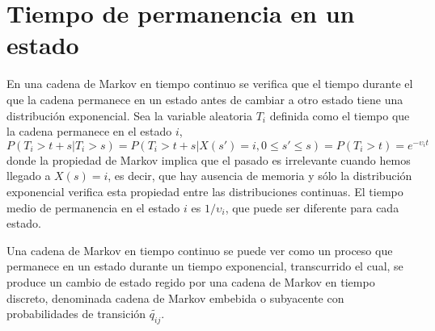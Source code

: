 \section{Tiempo de permanencia en un estado}
En una cadena de Markov en tiempo continuo se verifica que el
tiempo durante el que la cadena permanece en un estado antes de
cambiar a otro estado tiene una distribuci\'{o}n exponencial. Sea la
variable aleatoria $T_i$ definida como el tiempo que la cadena
permanece en el estado $i$,
\[
P(T_i>t+s|T_i>s)=P(T_i>t+s|X(s')=i,0\leq s'\leq s)=P( T_i > t )=
e^{-\upsilon_i t}
\]
donde la propiedad de Markov implica que el pasado es irrelevante
cuando hemos llegado a $X(s)=i$, es decir, que hay ausencia de
memoria y s\'{o}lo la distribuci\'{o}n exponencial verifica esta propiedad
entre las distribuciones continuas. El tiempo medio de
permanencia en el estado $i$ es $1/\upsilon_i$, que puede ser
diferente para cada estado.
\par
Una cadena de Markov en tiempo continuo se puede ver como un
proceso que permanece en un estado durante un tiempo exponencial,
transcurrido el cual, se produce un cambio de estado regido por
una cadena de Markov en tiempo discreto, denominada cadena de
Markov embebida o subyacente con probabilidades de transici\'{o}n
$\tilde{q_{ij}}$.
